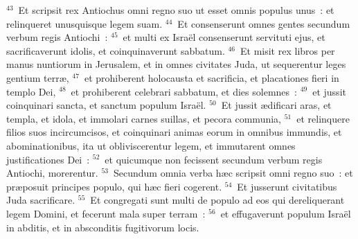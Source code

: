 ${}^{43}$~Et scripsit rex Antiochus omni regno suo ut esset omnis populus unus~: et relinqueret unusquisque legem suam.
${}^{44}$~Et consenserunt omnes gentes secundum verbum regis Antiochi~:
${}^{45}$~et multi ex Isra\"el consenserunt servituti ejus, et sacrificaverunt idolis, et coinquinaverunt sabbatum.
${}^{46}$~Et misit rex libros per manus nuntiorum in Jerusalem, et in omnes civitates Juda, ut sequerentur leges gentium terr\ae ,
${}^{47}$~et prohiberent holocausta et sacrificia, et placationes fieri in templo Dei,
${}^{48}$~et prohiberent celebrari sabbatum, et dies solemnes~:
${}^{49}$~et jussit coinquinari sancta, et sanctum populum Isra\"el.
${}^{50}$~Et jussit \ae dificari aras, et templa, et idola, et immolari carnes suillas, et pecora communia,
${}^{51}$~et relinquere filios suos incircumcisos, et coinquinari animas eorum in omnibus immundis, et abominationibus, ita ut obliviscerentur legem, et immutarent omnes justificationes Dei~:
${}^{52}$~et quicumque non fecissent secundum verbum regis Antiochi, morerentur.
${}^{53}$~Secundum omnia verba h\ae c scripsit omni regno suo~: et pr\ae posuit principes populo, qui h\ae c fieri cogerent.
${}^{54}$~Et jusserunt civitatibus Juda sacrificare.
${}^{55}$~Et congregati sunt multi de populo ad eos qui dereliquerant legem Domini, et fecerunt mala super terram~:
${}^{56}$~et effugaverunt populum Isra\"el in abditis, et in absconditis fugitivorum locis.


